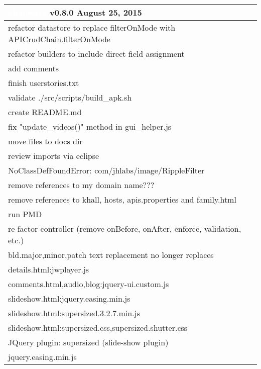 \documentclass[notitlepage]{article}
\newcommand{\releasedate}{August 25, 2015}
\begin{document}
\begin{center}
\begin{tabular}{ | l | }
\hline
\LARGE\cellcolor{myblue}\textcolor{white}{khallware} v0.8.0 \releasedate{} \\
\hline
refactor datastore to replace filterOnMode with APICrudChain.filterOnMode \\
\hline
refactor builders to include direct field assignment \\
\hline
add comments \\
\hline
finish userstories.txt \\
\hline
validate ./src/scripts/build\_apk.sh \\
\hline
create README.md \\
\hline
fix "update\_videos()" method in gui\_helper.js \\
\hline
move files to docs dir \\
\hline
review imports via eclipse \\
\hline
NoClassDefFoundError: com/jhlabs/image/RippleFilter \\
\hline
remove references to my domain name??? \\
\hline
remove references to khall, hosts, apis.properties and family.html \\
\hline
run PMD \\
\hline
re-factor controller (remove onBefore, onAfter, enforce, validation, etc.) \\
\hline
bld.major,minor,patch text replacement no longer replaces \\
\hline
details.html:jwplayer.js \\
\hline
comments.html,audio,blog:jquery-ui.custom.js \\
\hline
slideshow.html:jquery.easing.min.js \\
\hline
slideshow.html:supersized.3.2.7.min.js \\
\hline
slideshow.html:supersized.css,supersized.shutter.css \\
\hline
JQuery plugin: supersized (slide-show plugin) \\
\hline
jquery.easing.min.js \\
\hline

\end{tabular}
\end{center}
\end{document}
